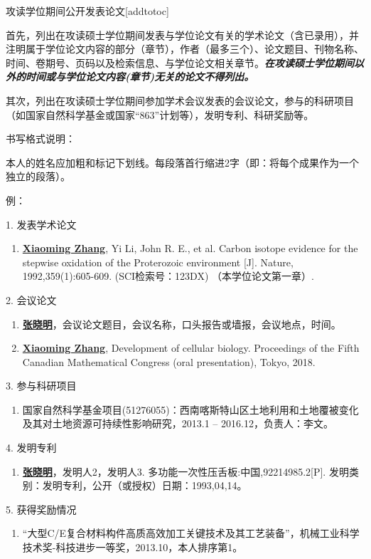 
\begin{personalcv}{攻读学位期间公开发表论文}[addtotoc]

首先，列出在攻读硕士学位期间发表与学位论文有关的学术论文（含已录用），并注明属于学位论文内容的部分（章节），作者（最多三个）、论文题目、刊物名称、时间、卷期号、页码以及检索信息、与学位论文相关章节。{\bf\itshape 在攻读硕士学位期间以外的时间或与学位论文内容(章节)无关的论文不得列出。}

其次，列出在攻读硕士学位期间参加学术会议发表的会议论文，参与的科研项目（如国家自然科学基金或国家“863”计划等），发明专利、科研奖励等。

书写格式说明：

本人的姓名应加粗和标记下划线。每段落首行缩进2字（即：将每个成果作为一个独立的段落）。

例：

1. 发表学术论文
\begin{enumerate}[nosep, label=$\lbrack$\arabic*$\rbrack$]
  \item{\underline{\bf Xiaoming Zhang}, Yi Li, John R. E., et al. Carbon isotope evidence for the stepwise oxidation of the Proterozoic environment [J]. Nature, 1992,359(1):605-609. (SCI检索号：123DX) （本学位论文第一章）.}
\end{enumerate}{}\vspace{1em}

2. 会议论文
\begin{enumerate}[nosep, label=$\lbrack$\arabic*$\rbrack$]
  \item{\underline{\bf 张晓明}，会议论文题目，会议名称，口头报告或墙报，会议地点，时间。}
  \item{\underline{\bf Xiaoming Zhang}, Development of cellular biology. Proceedings of the Fifth Canadian Mathematical Congress (oral presentation), Tokyo, 2018.}
\end{enumerate}{}\vspace{1em}

3. 参与科研项目
\begin{enumerate}[nosep, label=$\lbrack$\arabic*$\rbrack$]
  \item{国家自然科学基金项目(51276055)：西南喀斯特山区土地利用和土地覆被变化及其对土地资源可持续性影响研究，2013.1 – 2016.12，负责人：李文。} %
\end{enumerate}{}\vspace{1em}

4. 发明专利
\begin{enumerate}[nosep, label=$\lbrack$\arabic*$\rbrack$]
  \item{\underline{\bf 张晓明}，发明人2，发明人3. 多功能一次性压舌板:中国,92214985.2[P]. 发明类别：发明专利，公开（或授权）日期：1993,04,14。}
\end{enumerate}{}\vspace{1em}

5. 获得奖励情况
\begin{enumerate}[nosep, label=$\lbrack$\arabic*$\rbrack$]
  \item{“大型C/E复合材料构件高质高效加工关键技术及其工艺装备”，机械工业科学技术奖-科技进步一等奖，2013.10，本人排序第1。}
\end{enumerate}

\end{personalcv}


